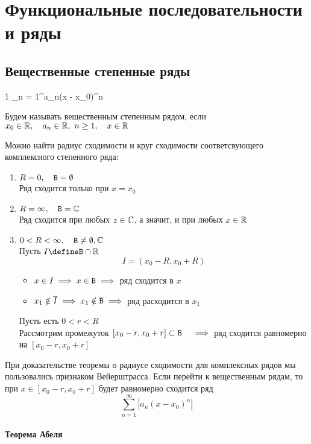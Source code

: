 \chapter{Функциональные последовательности и ряды}

\section{Вещественные степенные ряды}

\begin{definition}
	\begin{equ}1
		\sum_{n = 1}^\infty a_n(x - x_0)^n
	\end{equ}
	Будем называть  вещественным степенным рядом, если $ x_0 \in \mathbb{R}, \quad a_n \in \mathbb{R}, ~ n \ge 1, \quad x \in \mathbb{R} $
\end{definition}

Можно найти радиус сходимости и круг сходимости соответсвующего комплексного степенного ряда:

\begin{enumerate}
	\item $ R = 0, \quad \mathtt{B} = \emptyset $ \\
	Ряд сходится только при $ x = x_0 $
	\item $ R = \infty, \quad \mathtt{B} = \mathbb{C} $ \\
	Ряд сходится при любых $ z \in \mathbb{C} $, а значит, и при любых $ x \in \mathbb{R} $
	\item $ 0 < R < \infty, \quad \mathtt{B} \ne \emptyset, \mathbb{C} $ \\
	Пусть $ I \define \B \cap \R $
	$$ I = (x_0 - R, x_0 + R) $$
	\begin{itemize}
		\item $ x \in I \implies x \in \mathtt{B} \implies $ ряд сходится в $ x $
		\item $ x_1 \notin \overline I \implies x_1 \notin \overline{\mathtt{B}} \implies $ ряд расходится в $ x_1 $
	\end{itemize}
	Пусть есть $ 0 < r < R $ \\
	Рассмотрим промежуток $ [x_0 - r, x_0 + r] \subset \mathtt{B} \quad \implies $ ряд сходится равномерно на $ [x_0 - r, x_0 + r] $
\end{enumerate}

При доказательстве теоремы о радиусе сходимости для комплексных рядов мы пользовались признаком Вейерштрасса. Если перейти к вещественным рядам, то при $ x \in [x_0 - r, x_0 + r] $ будет равномерно сходится ряд
$$ \sum_{n = 1}^\infty |a_n(x - x_0)^n| $$

\subsubsection{Теорема Абеля}

